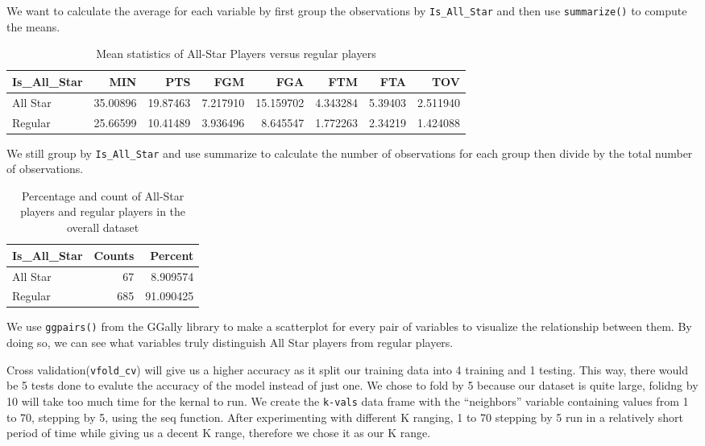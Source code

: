 \documentclass[
]{article}
\begin{document}
We want to calculate the average for each variable by first group the observations by \texttt{Is\_All\_Star} and then use \texttt{summarize()} to compute the means.

\begin{table}

\caption{\label{tab:table2}Mean statistics of All-Star Players versus regular players}
\centering
\begin{tabular}[t]{l|r|r|r|r|r|r|r}
\hline
Is\_All\_Star & MIN & PTS & FGM & FGA & FTM & FTA & TOV\\
\hline
All Star & 35.00896 & 19.87463 & 7.217910 & 15.159702 & 4.343284 & 5.39403 & 2.511940\\
\hline
Regular & 25.66599 & 10.41489 & 3.936496 & 8.645547 & 1.772263 & 2.34219 & 1.424088\\
\hline
\end{tabular}
\end{table}

We still group by \texttt{Is\_All\_Star} and use summarize to calculate the number of observations for each group then divide by the total number of observations.

\begin{table}

\caption{\label{tab:table3}Percentage and count of All-Star players and regular players in the overall dataset}
\centering
\begin{tabular}[t]{l|r|r}
\hline
Is\_All\_Star & Counts & Percent\\
\hline
All Star & 67 & 8.909574\\
\hline
Regular & 685 & 91.090425\\
\hline
\end{tabular}
\end{table}

We use \texttt{ggpairs()} from the GGally library to make a scatterplot for every pair of variables to visualize the relationship between them. By doing so, we can see what variables truly distinguish All Star players from regular players.

Cross validation(\texttt{vfold\_cv}) will give us a higher accuracy as it split our training data into 4 training and 1 testing. This way, there would be 5 tests done to evalute the accuracy of the model instead of just one. We chose to fold by 5 because our dataset is quite large, folidng by 10 will take too much time for the kernal to run. We create the \texttt{k-vals} data frame with the ``neighbors'' variable containing values from 1 to 70, stepping by 5, using the seq function. After experimenting with different K ranging, 1 to 70 stepping by 5 run in a relatively short period of time while giving us a decent K range, therefore we chose it as our K range.
\end{document}
